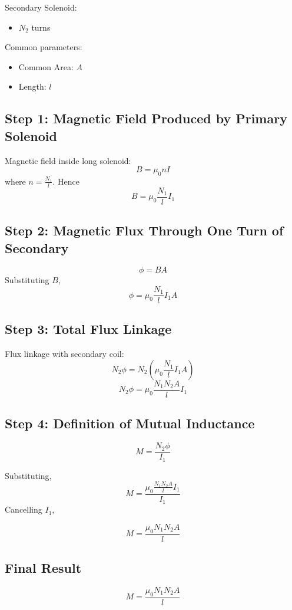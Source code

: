 \documentclass[11pt,a4paper]{article}
\begin{document}
Secondary Solenoid:
\begin{itemize}
    \item \( N_2 \) turns
\end{itemize}

Common parameters:
\begin{itemize}
    \item Common Area: \( A \)
    \item Length: \( l \)
\end{itemize}

\subsection*{Step 1: Magnetic Field Produced by Primary Solenoid}
Magnetic field inside long solenoid:
\[ B = \mu_0 n I \]
where \( n = \frac{N_1}{l} \).
Hence
\[ B = \mu_0 \frac{N_1}{l} I_1 \]

\subsection*{Step 2: Magnetic Flux Through One Turn of Secondary}
\[ \phi = BA \]
Substituting \( B \),
\[ \phi = \mu_0 \frac{N_1}{l} I_1 A \]

\subsection*{Step 3: Total Flux Linkage}
Flux linkage with secondary coil:
\[ N_2\phi = N_2 \left( \mu_0 \frac{N_1}{l} I_1 A \right) \]
\[ N_2\phi = \mu_0 \frac{N_1 N_2 A}{l} I_1 \]

\subsection*{Step 4: Definition of Mutual Inductance}
\begin{tcolorbox}[colback=RoyalBlue!5!white, colframe=RoyalBlue]
    \[ M = \frac{N_2\phi}{I_1} \]
\end{tcolorbox}
Substituting,
\[ M = \frac{\mu_0 \frac{N_1 N_2 A}{l} I_1}{I_1} \]
Cancelling \( I_1 \),
\begin{tcolorbox}[colback=RoyalBlue!5!white, colframe=RoyalBlue]
    \[ M = \frac{\mu_0 N_1 N_2 A}{l} \]
\end{tcolorbox}

\subsection*{Final Result}
\begin{tcolorbox}[colback=RoyalBlue!5!white, colframe=RoyalBlue]
    \[ M = \frac{\mu_0 N_1 N_2 A}{l} \]
\end{tcolorbox}
\end{document}
